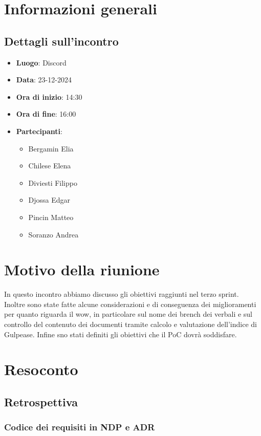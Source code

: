 \section{Informazioni generali}
\subsection{Dettagli sull'incontro}
\begin{itemize}
    \item \textbf{Luogo}: Discord
    \item \textbf{Data}: 23-12-2024
    \item \textbf{Ora di inizio}: 14:30
    \item \textbf{Ora di fine}: 16:00
    \item \textbf{Partecipanti}:
    \begin{itemize}
        \item Bergamin Elia
        \item Chilese Elena
        \item Diviesti Filippo
        \item Djossa Edgar
        \item Pincin Matteo 
        \item Soranzo Andrea  
    \end{itemize}
\end{itemize}

\section{Motivo della riunione}
In questo incontro abbiamo discusso gli obiettivi raggiunti nel terzo sprint. Inoltre sono state fatte alcune considerazioni e di conseguenza dei miglioramenti
per quanto riguarda il wow, in particolare sul nome dei brench dei verbali e sul controllo del contenuto dei documenti tramite calcolo e valutazione dell'indice di Gulpease.
Infine sno stati definiti gli obiettivi che il PoC dovrà soddisfare.

\section{Resoconto}
\subsection{Retrospettiva}

\subsubsection{Codice dei requisiti in NDP e ADR}



